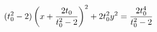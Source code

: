 \documentclass[preview]{standalone}
\begin{document}
\begin{align*}
\special{dvisvgm:raw <g id='unique000'>}(t_0^2-2)\left(x+\frac{2t_0}{t_0^2-2}\right)^2+2t_0^2y^2=\frac{2t_0^4}{t_0^2-2}\special{dvisvgm:raw </g>}
\end{align*}
\end{document}
